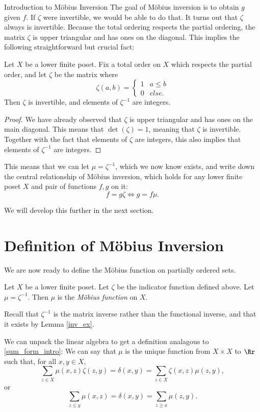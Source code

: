 \documentclass[12pt]{pom_thesis}
\begin{document}
\begin{chapter}{Introduction to M\"obius Inversion}
The goal of M\"obius inversion is to obtain $g$ given $f$. If $\zeta$ were invertible, we would be able to do that. It turns out that $\zeta$ always is invertible. Because the total ordering respects the partial ordering, the matrix $\zeta$ is upper triangular and has ones on the diagonal. This implies the following straightforward but crucial fact:
\begin{lemma}\label{inv_ex}
Let $X$ be a lower finite poset. Fix a total order on $X$ which respects the partial order, and let $\zeta$ be the matrix where 
\[
\zeta(a,b) = \begin{cases}1 & a \leq b \\ 0 & else. \end{cases}
\]
Then $\zeta$ is invertible, and elements of $\zeta^{-1}$ are integers.
\end{lemma}
\begin{proof}
We have already observed that $\zeta$ is upper triangular and has ones on the main diagonal. This means that $\det(\zeta) = 1$, meaning that $\zeta$ is invertible. Together with the fact that elements of $\zeta$ are integers, this also implies that elements of $\zeta^{-1}$ are integers.
\end{proof}

This means that we can let $\mu=\zeta^{-1}$, which we now know exists, and write down the central relationship of M\"obius inversion, which holds for any lower finite poset $X$ and pair of functions $f,g$ on it:
\[
f = g \zeta \iff g = f \mu.
\]

We will develop this further in the next section.

\section{Definition of M\"obius Inversion}
We are now ready to define the M\"obius function on partially ordered sets.
\begin{defn}\label{def_mob_pos}
Let $X$ be a lower finite poset. Let $\zeta$ be the indicator function defined above. Let $\mu = \zeta^{-1}$. Then $\mu$ is the \emph{M\"obius function} on $X$.
\end{defn}
\begin{rmk}
Recall that $\zeta^{-1}$ is the matrix inverse rather than the functional inverse, and that it exists by Lemma \ref{inv_ex}.
\end{rmk}
\begin{rmk}\label{sum_form}
We can unpack the linear algebra to get a definition analagous to \eqref{sum_form_intro}: We can say that $\mu$ is the unique function from $X\times X$ to $\Rr$ such that, for all $x,y \in X$,
\[
\sum_{z \in X} \mu(x,z)\zeta(z,y) = \delta(x,y) = \sum_{z \in X} \zeta(x,z)\mu(z,y),
\]
or
\[
\sum_{z \leq y} \mu(x,z) = \delta(x,y) = \sum_{z \geq x} \mu(z,y).
\]
\end{rmk}


\end{chapter}
\end{document}
